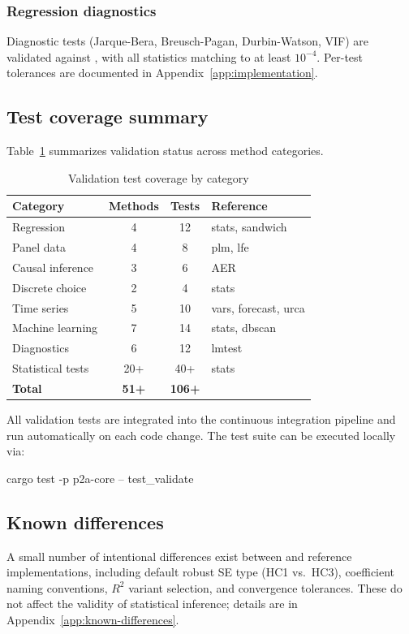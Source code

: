 \subsubsection{Regression diagnostics}

Diagnostic tests (Jarque-Bera, Breusch-Pagan, Durbin-Watson, VIF) are
validated against , with all statistics matching to at least
$10^{-4}$. Per-test tolerances are documented in
Appendix~\ref{app:implementation}.


\subsection{Test coverage summary} \label{sec:validation-coverage}

Table~\ref{tab:validation-summary} summarizes validation status across
method categories.

\begin{table}[htbp]
\centering
\caption{Validation test coverage by category}
\label{tab:validation-summary}
\begin{tabular}{lccl}
\toprule
Category & Methods & Tests & Reference \\
\midrule
Regression & 4 & 12 & stats, sandwich \\
Panel data & 4 & 8 & plm, lfe \\
Causal inference & 3 & 6 & AER \\
Discrete choice & 2 & 4 & stats \\
Time series & 5 & 10 & vars, forecast, urca \\
Machine learning & 7 & 14 & stats, dbscan \\
Diagnostics & 6 & 12 & lmtest \\
Statistical tests & 20+ & 40+ & stats \\
\midrule
\textbf{Total} & \textbf{51+} & \textbf{106+} & \\
\bottomrule
\end{tabular}
\end{table}

All validation tests are integrated into the continuous integration pipeline
and run automatically on each code change. The test suite can be executed
locally via:

\begin{Sinput}
cargo test -p p2a-core -- test_validate
\end{Sinput}


\subsection{Known differences} \label{sec:validation-differences}

A small number of intentional differences exist between 
and reference implementations, including default robust SE type (HC1 vs.\
HC3), coefficient naming conventions, $R^2$ variant selection, and
convergence tolerances. These do not affect the validity of statistical
inference; details are in Appendix~\ref{app:known-differences}.

